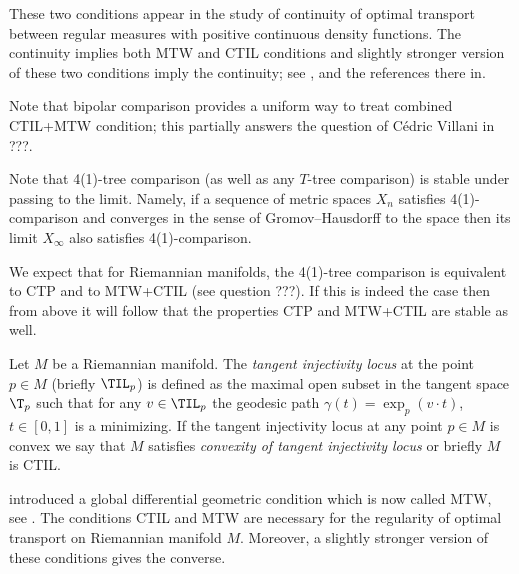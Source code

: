 These two conditions appear in the study of continuity of optimal transport between regular measures with positive continuous density functions.
The continuity implies both MTW and CTIL conditions and slightly stronger version of these two conditions imply the continuity;
see \cite{FRV-Nec+Suf}, \cite{MTW+CTIL} and the references there in.


Note that bipolar comparison provides a uniform way to treat combined CTIL+MTW condition;
this partially answers the question of Cédric Villani in ???.

Note that 4(1)-tree comparison (as well as any $T$-tree comparison) is stable under passing to the limit.
Namely, if a sequence of metric spaces $X_n$ satisfies 4(1)-comparison and converges in the sense of Gromov--Hausdorff to the space  then its limit $X_\infty$ also satisfies 4(1)-comparison.

We expect that for Riemannian manifolds, the 4(1)-tree comparison is equivalent to CTP and to MTW+CTIL (see question ???).
If this is indeed the case then from above it will follow that the properties CTP and MTW+CTIL are stable as well.






















Let $M$ be a Riemannian manifold.
The \emph{tangent injectivity locus} at the point $p\in M$ (briefly $\TIL_p$) is defined as the maximal open subset in the tangent space $\T_p$ such that for any $v\in\TIL_p$ the geodesic path $\gamma(t)=\exp_p(v\cdot t)$, $t\in [0,1]$ is a minimizing.
If the tangent injectivity locus at any point $p\in M$ is convex we say that $M$ satisfies \emph{convexity of  tangent injectivity locus} or briefly $M$ is CTIL.

 introduced a global differential geometric condition which is now called MTW, see .
The conditions CTIL and MTW are necessary for the regularity of optimal transport on Riemannian manifold $M$.
Moreover, a slightly stronger version of these conditions gives the converse.












